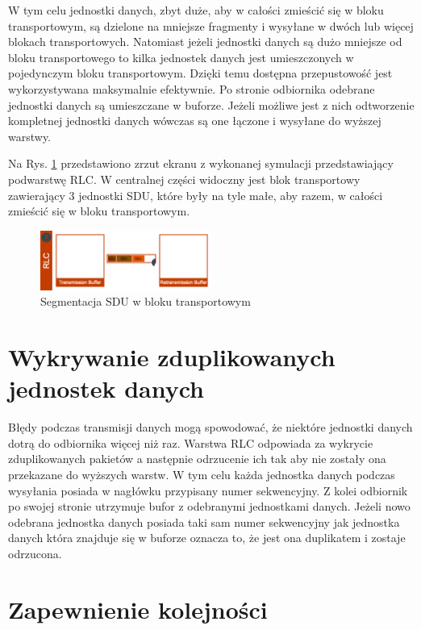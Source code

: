 W tym celu jednostki danych, zbyt duże, aby w całości zmieścić się w bloku transportowym, są dzielone na mniejsze fragmenty i wysyłane w dwóch lub więcej blokach transportowych. Natomiast jeżeli jednostki danych są dużo mniejsze od bloku transportowego to kilka jednostek danych jest umieszczonych w pojedynczym bloku transportowym. Dzięki temu dostępna przepustowość jest wykorzystywana maksymalnie efektywnie. Po stronie odbiornika odebrane jednostki danych są umieszczane w buforze. Jeżeli możliwe jest z nich odtworzenie kompletnej jednostki danych wówczas są one łączone i wysyłane do wyższej warstwy.

Na Rys. \ref{fig:rlc_simulation} przedstawiono zrzut ekranu z wykonanej symulacji przedstawiający podwarstwę RLC. W centralnej części widoczny jest blok transportowy zawierający 3 jednostki SDU, które były na tyle małe, aby razem, w całości zmieścić się w bloku transportowym.

\begin{figure}
	\centerline{\includegraphics[width=0.5\textwidth]{images/rlc_transport_block.png}}
	\caption{Segmentacja SDU w bloku transportowym}
	\label{fig:rlc_simulation}
\end{figure}
  
\section{Wykrywanie zduplikowanych jednostek danych}

Błędy podczas transmisji danych mogą spowodować, że niektóre jednostki danych dotrą do odbiornika więcej niż raz. Warstwa RLC odpowiada za wykrycie zduplikowanych pakietów a następnie odrzucenie ich tak aby nie zostały ona przekazane do wyższych warstw. W tym celu każda jednostka danych podczas wysyłania posiada w nagłówku przypisany numer sekwencyjny. Z kolei odbiornik po swojej stronie utrzymuje bufor z odebranymi jednostkami danych. Jeżeli nowo odebrana jednostka danych posiada taki sam numer sekwencyjny jak jednostka danych która znajduje się w buforze oznacza to, że jest ona duplikatem i zostaje odrzucona.

\section{Zapewnienie kolejności}


